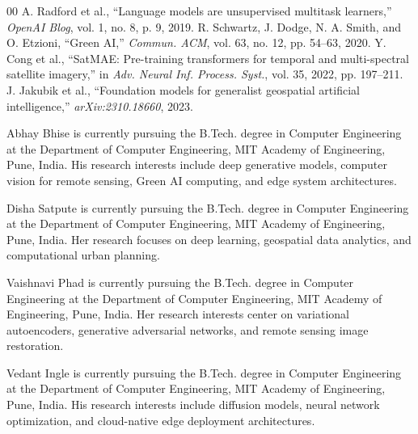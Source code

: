 \documentclass[journal]{IEEEtran}
\begin{document}
\begin{thebibliography}{00}
 A. Radford et al., ``Language models are unsupervised multitask learners,'' \textit{OpenAI Blog}, vol. 1, no. 8, p. 9, 2019.
 R. Schwartz, J. Dodge, N. A. Smith, and O. Etzioni, ``Green AI,'' \textit{Commun. ACM}, vol. 63, no. 12, pp. 54--63, 2020.
 Y. Cong et al., ``SatMAE: Pre-training transformers for temporal and multi-spectral satellite imagery,'' in \textit{Adv. Neural Inf. Process. Syst.}, vol. 35, 2022, pp. 197--211.
 J. Jakubik et al., ``Foundation models for generalist geospatial artificial intelligence,'' \textit{arXiv:2310.18660}, 2023.
\end{thebibliography}

\begin{IEEEbiographynophoto}{Abhay Bhise}
is currently pursuing the B.Tech. degree in Computer Engineering at the Department of Computer Engineering, MIT Academy of Engineering, Pune, India. His research interests include deep generative models, computer vision for remote sensing, Green AI computing, and edge system architectures.
\end{IEEEbiographynophoto}

\begin{IEEEbiographynophoto}{Disha Satpute}
is currently pursuing the B.Tech. degree in Computer Engineering at the Department of Computer Engineering, MIT Academy of Engineering, Pune, India. Her research focuses on deep learning, geospatial data analytics, and computational urban planning.
\end{IEEEbiographynophoto}

\begin{IEEEbiographynophoto}{Vaishnavi Phad}
is currently pursuing the B.Tech. degree in Computer Engineering at the Department of Computer Engineering, MIT Academy of Engineering, Pune, India. Her research interests center on variational autoencoders, generative adversarial networks, and remote sensing image restoration.
\end{IEEEbiographynophoto}

\begin{IEEEbiographynophoto}{Vedant Ingle}
is currently pursuing the B.Tech. degree in Computer Engineering at the Department of Computer Engineering, MIT Academy of Engineering, Pune, India. His research interests include diffusion models, neural network optimization, and cloud-native edge deployment architectures.
\end{IEEEbiographynophoto}
\end{document}

